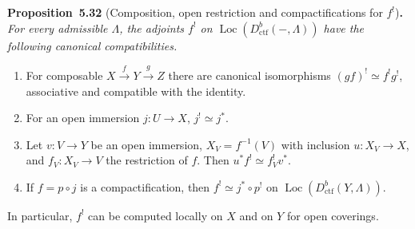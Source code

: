 \documentclass[11pt]{article}
\newenvironment{bpstatement}[2]{\par\addvspace{0.6\baselineskip}\noindent\textbf{#1}#2\textbf{.}\enspace\ignorespaces}
  {\par\addvspace{0.4\baselineskip}}
\newenvironment{bpstatementit}[2]{\begin{bpstatement}{#1}{#2}\itshape\ignorespaces}{\end{bpstatement}}
\providecommand{\Loc}{}\renewcommand{\Loc}{\operatorname{Loc}}
\begin{document}
\label{bp510}%
\begin{bpstatementit}{Proposition~5.32}{ (Composition, open restriction and compactifications for $f^!$)}
For every admissible \(\Lambda\), the adjoints \(f^!\) on \(\Loc(D^b_{\mathrm{ctf}}(-,\Lambda))\) have the following canonical compatibilities.

\begin{enumerate}
\item For composable \(X\xrightarrow fY\xrightarrow gZ\) there are canonical isomorphisms \((gf)^!\simeq f^!g^!\), associative and compatible with the identity.
\item For an open immersion \(j:U\to X\), \(j^!\simeq j^*\).
\item Let \(v:V\to Y\) be an open immersion, \(X_V=f^{-1}(V)\) with inclusion \(u:X_V\to X\), and \(f_V:X_V\to V\) the restriction of \(f\). Then \(u^*f^!\simeq f_V^!v^*\).
\item If \(f=p\circ j\) is a compactification, then \(f^!\simeq j^*\circ p^!\) on \(\Loc(D^b_{\mathrm{ctf}}(Y,\Lambda))\).
\end{enumerate}

In particular, \(f^!\) can be computed locally on \(X\) and on \(Y\) for open coverings.
\end{bpstatementit}
\end{document}
